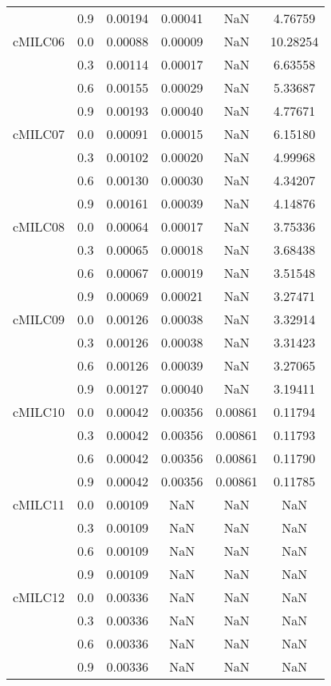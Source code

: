 \begin{longtable}{cccccc}
        & 0.9 & 0.00194 & 0.00041 & NaN & 4.76759 \\
cMILC06 & 0.0 & 0.00088 & 0.00009 & NaN & 10.28254 \\
        & 0.3 & 0.00114 & 0.00017 & NaN & 6.63558 \\
        & 0.6 & 0.00155 & 0.00029 & NaN & 5.33687 \\
        & 0.9 & 0.00193 & 0.00040 & NaN & 4.77671 \\
cMILC07 & 0.0 & 0.00091 & 0.00015 & NaN & 6.15180 \\
        & 0.3 & 0.00102 & 0.00020 & NaN & 4.99968 \\
        & 0.6 & 0.00130 & 0.00030 & NaN & 4.34207 \\
        & 0.9 & 0.00161 & 0.00039 & NaN & 4.14876 \\
cMILC08 & 0.0 & 0.00064 & 0.00017 & NaN & 3.75336 \\
        & 0.3 & 0.00065 & 0.00018 & NaN & 3.68438 \\
        & 0.6 & 0.00067 & 0.00019 & NaN & 3.51548 \\
        & 0.9 & 0.00069 & 0.00021 & NaN & 3.27471 \\
cMILC09 & 0.0 & 0.00126 & 0.00038 & NaN & 3.32914 \\
        & 0.3 & 0.00126 & 0.00038 & NaN & 3.31423 \\
        & 0.6 & 0.00126 & 0.00039 & NaN & 3.27065 \\
        & 0.9 & 0.00127 & 0.00040 & NaN & 3.19411 \\
cMILC10 & 0.0 & 0.00042 & 0.00356 & 0.00861 & 0.11794 \\
        & 0.3 & 0.00042 & 0.00356 & 0.00861 & 0.11793 \\
        & 0.6 & 0.00042 & 0.00356 & 0.00861 & 0.11790 \\
        & 0.9 & 0.00042 & 0.00356 & 0.00861 & 0.11785 \\
cMILC11 & 0.0 & 0.00109 & NaN & NaN & NaN \\
        & 0.3 & 0.00109 & NaN & NaN & NaN \\
        & 0.6 & 0.00109 & NaN & NaN & NaN \\
        & 0.9 & 0.00109 & NaN & NaN & NaN \\
cMILC12 & 0.0 & 0.00336 & NaN & NaN & NaN \\
        & 0.3 & 0.00336 & NaN & NaN & NaN \\
        & 0.6 & 0.00336 & NaN & NaN & NaN \\
        & 0.9 & 0.00336 & NaN & NaN & NaN \\
\end{longtable}
